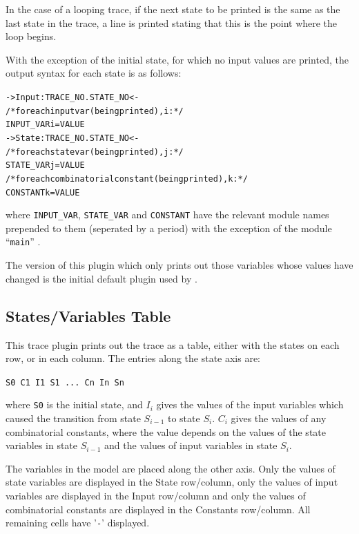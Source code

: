 In the case of a looping trace, if the next state to be printed is the
same as the last state in the trace, a line is printed stating that
this is the point where the loop begins.

With the exception of the initial state, for which no input values are
printed, the output syntax for each state is as follows:

\begin{alltt}
-> Input: TRACE_NO.STATE_NO <-
    /* for each input var (being printed), i: */
    INPUT_VARi = VALUE
-> State: TRACE_NO.STATE_NO <-
    /* for each state var (being printed), j: */
    STATE_VARj = VALUE
    /* for each combinatorial constant (being printed), k: */
    CONSTANTk = VALUE
\end{alltt}

where \texttt{INPUT\_VAR}, \texttt{STATE\_VAR} and \texttt{CONSTANT}
have the relevant module names prepended to them (seperated by a
period) with the exception of the module ``\texttt{main}'' .

The version of this plugin which only prints out those variables whose
values have changed is the initial default plugin used by \nusmv.


\subsection{States/Variables Table}
\label{States/Variables Table}

This trace plugin prints out the trace as a table, either with the
states on each row, or in each column. The entries along the state
axis are:

\begin{center}
\texttt{S0 C1 I1 S1 ...~Cn In Sn}
\end{center}

where \texttt{S0} is the initial state, and \texttt{$I_i$} gives the
values of the input variables which caused the transition from state
\texttt{$S_{i-1}$} to state \texttt{$S_i$}. \texttt{$C_i$} gives the
values of any combinatorial constants, where the value depends on the
values of the state variables in state \texttt{$S_{i-1}$} and the
values of input variables in state \texttt{$S_i$}.

The variables in the model are placed along the other axis. Only the
values of state variables are displayed in the State row/column, only
the values of input variables are displayed in the Input row/column
and only the values of combinatorial constants are displayed in the
Constants row/column. All remaining cells have '\texttt{-}' displayed.



